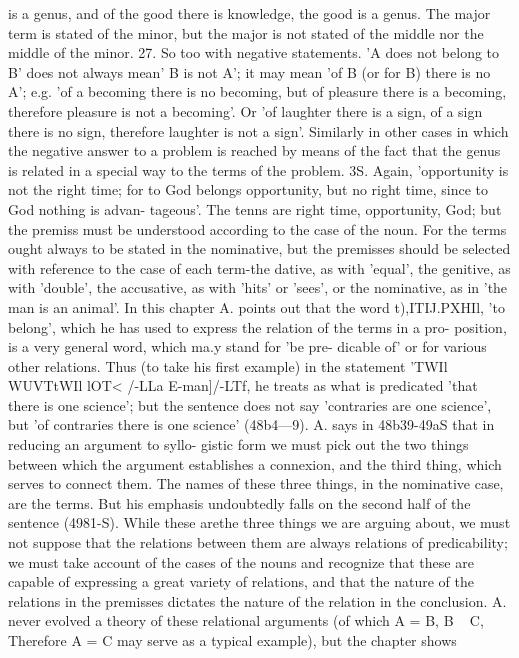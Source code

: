 {{{{{{{{{{{{{{{{{{{{{{{{{{is a genus, and of the good there is knowledge, the good is a genus.
The major term is stated of the minor, but the major is not stated
of the middle nor the middle of the minor.
27. So too with negative statements. 'A does not belong to B'
does not always mean' B is not A'; it may mean 'of B (or for B)
there is no A'; e.g. 'of a becoming there is no becoming, but of
pleasure there is a becoming, therefore pleasure is not a becoming'.
Or 'of laughter there is a sign, of a sign there is no sign, therefore
laughter is not a sign'. Similarly in other cases in which the
negative answer to a problem is reached by means of the fact that
the genus is related in a special way to the terms of the problem.
3S. Again, 'opportunity is not the right time; for to God belongs
opportunity, but no right time, since to God nothing is advan-
tageous'. The tenns are right time, opportunity, God; but the
premiss must be understood according to the case of the noun.
For the terms ought always to be stated in the nominative, but
the premisses should be selected with reference to the case of each
term-the dative, as with 'equal', the genitive, as with 'double',
the accusative, as with 'hits' or 'sees', or the nominative, as in 'the
man is an animal'.
In this chapter A. points out that the word t),ITIJ.PXHIl, 'to belong',
which he has used to express the relation of the terms in a pro-
position, is a very general word, which ma.y stand for 'be pre-
dicable of' or for various other relations. Thus (to take his first
example) in the statement 'TWIl WUVTtWIl lOT< /-LLa E-man]/-LTf, he
treats as what is predicated 'that there is one science'; but
the sentence does not say 'contraries are one science', but 'of
contraries there is one science' (48b4---9).
A. says in 48b39-49aS that in reducing an argument to syllo-
gistic form we must pick out the two things between which the
argument establishes a connexion, and the third thing, which
serves to connect them. The names of these three things, in the
nominative case, are the terms. But his emphasis undoubtedly
falls on the second half of the sentence (4981-S). While these arethe three things we are arguing about, we must not suppose that
the relations between them are always relations of predicability;
we must take account of the cases of the nouns and recognize
that these are capable of expressing a great variety of relations,
and that the nature of the relations in the premisses dictates the
nature of the relation in the conclusion. A. never evolved a theory
of these relational arguments (of which A = B, B ~ C, Therefore
A = C may serve as a typical example), but the chapter shows
}}}}}}}}}}}}}}}}}}}}}}}}}}
